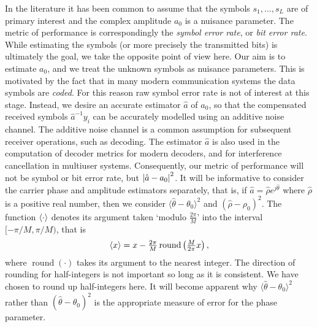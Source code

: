 \documentclass{article}
\begin{document}

In the literature it has been common to assume that the symbols $s_1, \dots, s_L$ are of primary interest and the complex amplitude $a_0$ is a nuisance parameter.  The metric of performance is correspondingly the \emph{symbol error rate}, or \emph{bit error rate}.  While estimating the symbols (or more precisely the transmitted bits) is ultimately the goal, we take the opposite point of view here.  Our aim is to estimate $a_0$, and we treat the unknown symbols as nuisance parameters.  This is motivated by the fact that in many modern communication systems the data symbols are \emph{coded}.  For this reason raw symbol error rate is not of interest at this stage.  Instead, we desire an accurate estimator $\hat{a}$ of $a_0$, so that the compensated received symbols $\hat{a}^{-1}y_i$ can be accurately modelled using an additive noise channel.  The additive noise channel is a common assumption for subsequent receiver operations, such as decoding.  The estimator $\hat{a}$ is also used in the computation of decoder metrics for modern decoders, and for interference cancellation in multiuser systems.  Consequently, our metric of performance will not be symbol or bit error rate, but ${\left\vert \hat{a} - a_0 \right\vert}^2$. It will be informative to consider the carrier phase and amplitude estimators separately, that is, if $\hat{a} = \hat{\rho}e^{j\hat{\theta}}$ where $\hat{\rho}$ is a positive real number, then we consider $\langle\hat{\theta} - \theta_0\rangle^2$ and $(\hat{\rho} - \rho_0)^2$.  The function $\left\langle \cdot \right\rangle$ denotes its argument taken `modulo $\tfrac{2\pi}{M}$' into the interval $[-\pi/M, \pi/M)$, that is
\[
\left\langle x \right\rangle = x - \tfrac{2\pi}{M}\operatorname{round}\left(\tfrac{M}{2\pi}x\right),
\]  
where $\operatorname{round}(\cdot)$ takes its argument to the nearest integer.  The direction of rounding for half-integers is not important so long as it is consistent.  We have chosen to round up half-integers here.  
It will become apparent why $\langle\hat{\theta} - \theta_0\rangle^2$ rather than $(\hat{\theta} - \theta_0)^2$ is the appropriate measure of error for the phase parameter.
\end{document}
